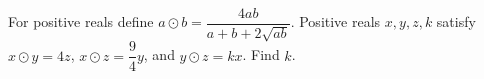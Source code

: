 For positive reals define $a\odot b=\dfrac{4ab}{a+b+2\sqrt{ab}}$. Positive reals $x,y,z,k$ satisfy $x\odot y=4z$, $x\odot z=\dfrac{9}{4}y$, and $y\odot z=kx$. Find $k$.
